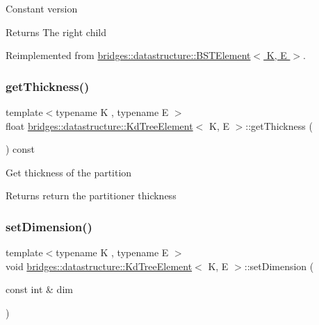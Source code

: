 Constant version

\begin{DoxyReturn}{Returns}
The right child 
\end{DoxyReturn}


Reimplemented from \hyperlink{classbridges_1_1datastructure_1_1_b_s_t_element_a012f0eb09c3d62b14c73109e6ded0879}{bridges\+::datastructure\+::\+B\+S\+T\+Element$<$ K, E $>$}.

\mbox{\label{classbridges_1_1datastructure_1_1_kd_tree_element_ae75460d9b4cfbcf013b0376a8f2948ec}} 
\subsubsection{\texorpdfstring{get\+Thickness()}{getThickness()}}
{\footnotesize\ttfamily template$<$typename K , typename E $>$ \\
float \hyperlink{classbridges_1_1datastructure_1_1_kd_tree_element}{bridges\+::datastructure\+::\+Kd\+Tree\+Element}$<$ K, E $>$\+::get\+Thickness (\begin{DoxyParamCaption}{ }\end{DoxyParamCaption}) const\hspace{0.3cm}{\ttfamily [inline]}}

Get thickness of the partition \begin{DoxyReturn}{Returns}
return the partitioner thickness 
\end{DoxyReturn}
\mbox{\label{classbridges_1_1datastructure_1_1_kd_tree_element_a9862bde7b85254224963e23dd9bcee29}} 
\subsubsection{\texorpdfstring{set\+Dimension()}{setDimension()}}
{\footnotesize\ttfamily template$<$typename K , typename E $>$ \\
void \hyperlink{classbridges_1_1datastructure_1_1_kd_tree_element}{bridges\+::datastructure\+::\+Kd\+Tree\+Element}$<$ K, E $>$\+::set\+Dimension (\begin{DoxyParamCaption}\item[{const int \&}]{dim }\end{DoxyParamCaption})\hspace{0.3cm}{\ttfamily [inline]}}

